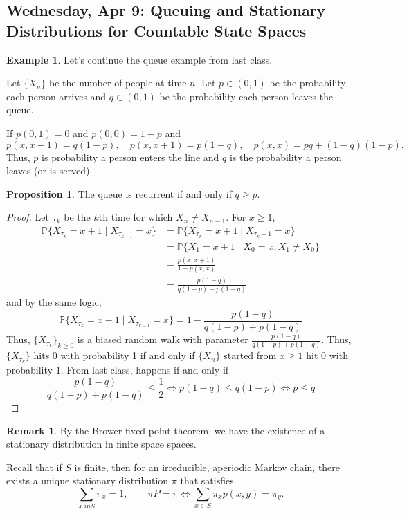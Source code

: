 \documentclass[10pt, oneside]{article}
\newcommand{\bbP}{\mathbb{P}}
\theoremstyle{definition}
\newtheorem{exmp}{Example}[section]
\newtheorem{prop}{Proposition}
\newtheorem{rem}{Remark}
\begin{document}
\subsection{Wednesday, Apr 9: Queuing and Stationary Distributions for Countable State Spaces}
\begin{exmp}
    Let's continue the queue example from last class.
    
    Let $\{X_n\}$ be the number of people at time $n.$ Let $p \in (0,1)$ be the probability each person arrives and $q \in (0,1)$ be the probability each person leaves the queue. 
    
    If $p(0,1) = 0$ and $p(0,0) = 1-p$ and
    \[p(x,x-1) = q(1-p), \quad p(x,x+1) = p(1-q), \quad p(x,x) = pq + (1-q)(1-p).\] Thus, $p$ is probability a person enters the line and $q$ is the probability a person leaves (or is served). 
    \begin{prop}
        The queue is recurrent if and only if $q \geq p.$ 
    \end{prop}
    \begin{proof}
        Let $\tau_k$ be the $k$th time for which $X_n \neq X_{n-1}.$ For $x \geq 1,$ 
        \begin{align*}
        \bbP\{X_{\tau_k} = x + 1 \mid X_{\tau_{k-1}}= x\} &= \bbP\{X_{\tau_k} = x + 1 \mid X_{\tau_k -1} = x\}\\ &= \bbP\{X_1 = x + 1 \mid X_0 = x, X_1 \neq X_0\}\\ &= \frac{p(x,x+1)}{1 - p(x,x)}\\ &= \frac{p(1-q)}{q(1-p) + p(1-q)}    
        \end{align*}
        and by the same logic, 
        \[\bbP\{X_{\tau_k} = x-1 \mid X_{\tau_{k-1}} = x\} = 1- \frac{p(1-q)}{q(1-p) + p(1-q)}\]
        Thus, $\{X_{\tau_k}\}_{k\geq 0}$ is a biased random walk with parameter $\frac{p(1-q)}{q(1-p) + p(1-q)}.$ Thus, $\{X_{\tau_k}\}$ hits $0$ with probability 1 if and only if $\{X_n\}$ started from $x\geq 1$ hit $0$ with probability $1.$ From last class, happens if and only if 
        \[\frac{p(1-q)}{q(1-p) + p(1-q)} \leq \frac{1}{2} \iff p(1-q) \leq q(1-p) \iff p \leq q\]
    \end{proof}
\end{exmp}

\begin{rem}
    By the Brower fixed point theorem, we have the existence of a stationary distribution in finite space spaces. 
\end{rem}

Recall that if $S$ is finite, then for an irreducible, aperiodic Markov chain, there exists a unique stationary distribution $\pi$ that satisfies 
\[\sum_{x\ in S} \pi_x = 1 , \qquad \pi P = \pi \iff \sum_{x\in S} \pi_x p(x,y) = \pi_y.\]
\end{document}

